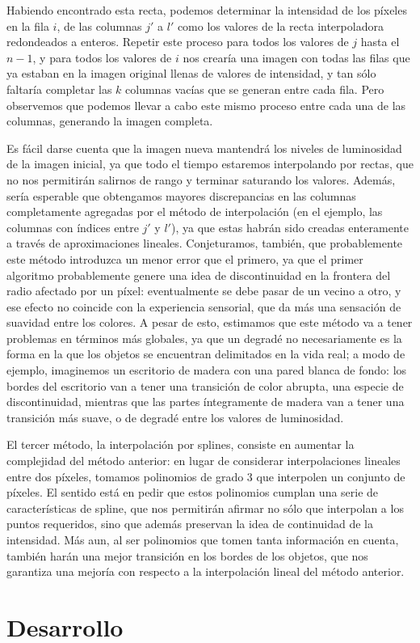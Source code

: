 \documentclass{article}
\begin{document}
Habiendo encontrado esta recta, podemos determinar la intensidad de los píxeles en la fila $i$, de las columnas $j'$ a $l'$ como los valores de la recta interpoladora redondeados a enteros. Repetir este proceso para todos los valores de $j$ hasta el $n - 1$, y para todos los valores de $i$ nos crearía una imagen con todas las filas que ya estaban en la imagen original llenas de valores de intensidad, y tan sólo faltaría completar las $k$ columnas vacías que se generan entre cada fila. Pero observemos que podemos llevar a cabo este mismo proceso entre cada una de las columnas, generando la imagen completa.

Es fácil darse cuenta que la imagen nueva mantendrá los niveles de luminosidad de la imagen inicial, ya que todo el tiempo estaremos interpolando por rectas, que no nos permitirán salirnos de rango y terminar saturando los valores. Además, sería esperable que obtengamos mayores discrepancias en las columnas completamente agregadas por el método de interpolación (en el ejemplo, las columnas con índices entre $j'$ y $l'$), ya que estas habrán sido creadas enteramente a través de aproximaciones lineales. Conjeturamos, también, que probablemente este método introduzca un menor error que el primero, ya que el primer algoritmo probablemente genere una idea de discontinuidad en la frontera del radio afectado por un píxel: eventualmente se debe pasar de un vecino a otro, y ese efecto no coincide con la experiencia sensorial, que da más una sensación de suavidad entre los colores. A pesar de esto, estimamos que este método va a tener problemas en términos más globales, ya que un degradé no necesariamente es la forma en la que los objetos se encuentran delimitados en la vida real; a modo de ejemplo, imaginemos un escritorio de madera con una pared blanca de fondo: los bordes del escritorio van a tener una transición de color abrupta, una especie de discontinuidad, mientras que las partes íntegramente de madera van a tener una transición más suave, o de degradé entre los valores de luminosidad.

El tercer método, la interpolación por splines, consiste en aumentar la complejidad del método anterior: en lugar de considerar interpolaciones lineales entre dos píxeles, tomamos polinomios de grado 3 que interpolen un conjunto de píxeles. El sentido está en pedir que estos polinomios cumplan una serie de características de spline, que nos permitirán afirmar no sólo que interpolan a los puntos requeridos, sino que además preservan la idea de continuidad de la intensidad. Más aun, al ser polinomios que tomen tanta información en cuenta, también harán una mejor transición en los bordes de los objetos, que nos garantiza una mejoría con respecto a la interpolación lineal del método anterior.

\pagebreak

\section*{Desarrollo}{}
\end{document}
